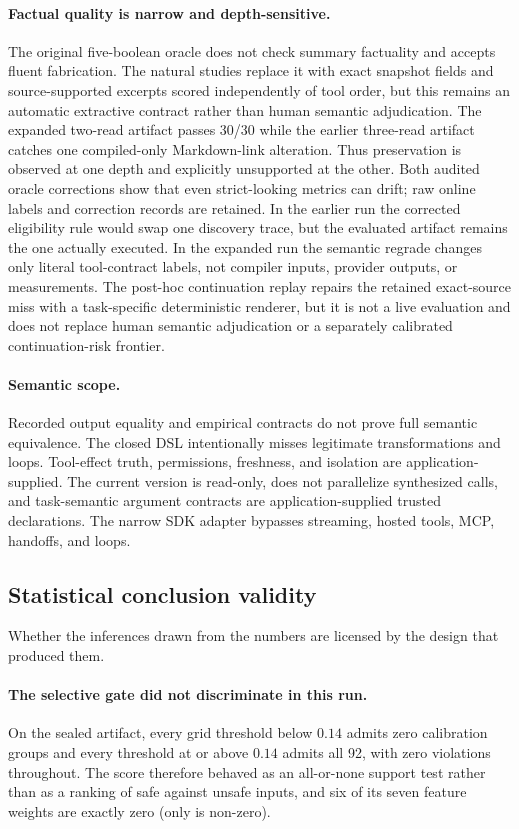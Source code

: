 \paragraph{Factual quality is narrow and depth-sensitive.}
The original five-boolean oracle does not check summary factuality and accepts fluent
fabrication.  The natural studies replace it with exact snapshot fields and source-supported
excerpts scored independently of tool order, but this remains an automatic extractive
contract rather than human semantic adjudication.  The expanded two-read artifact passes
30/30 while the earlier three-read artifact catches one compiled-only Markdown-link
alteration.  Thus preservation is observed at one depth and explicitly unsupported at the
other.  Both audited oracle corrections show that even strict-looking metrics can drift;
raw online labels and correction records are retained.  In the earlier run the corrected
eligibility rule would swap one discovery trace, but the evaluated artifact remains the
one actually executed.  In the expanded run the semantic regrade changes only literal
tool-contract labels, not compiler inputs, provider outputs, or measurements.
The post-hoc continuation replay repairs the retained exact-source miss with a
task-specific deterministic renderer, but it is not a live evaluation and does not replace
human semantic adjudication or a separately calibrated continuation-risk frontier.

\paragraph{Semantic scope.}
Recorded output equality and empirical contracts do not prove full semantic equivalence.
The closed DSL intentionally misses legitimate transformations and loops.  Tool-effect
truth, permissions, freshness, and isolation are application-supplied.  The current
version is read-only, does not parallelize synthesized calls, and task\hyp{}semantic
argument contracts are application\hyp{}supplied trusted declarations.  The narrow SDK adapter
bypasses streaming, hosted tools, MCP, handoffs, and loops.

\subsection{Statistical conclusion validity}

Whether the inferences drawn from the numbers are licensed by the design that produced them.

\paragraph{The selective gate did not discriminate in this run.}
On the sealed artifact, every grid threshold below $0.14$ admits zero calibration groups
and every threshold at or above $0.14$ admits all 92, with zero violations throughout.  The
score therefore behaved as an all-or-none support test rather than as a ranking of safe
against unsafe inputs, and six of its seven feature weights are exactly zero (only
 is non-zero).

